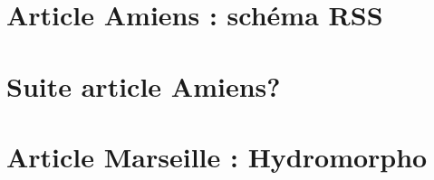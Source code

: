 
\section{Article Amiens : schéma RSS}

\section{Suite article Amiens?}

\section{Article Marseille : Hydromorpho}
